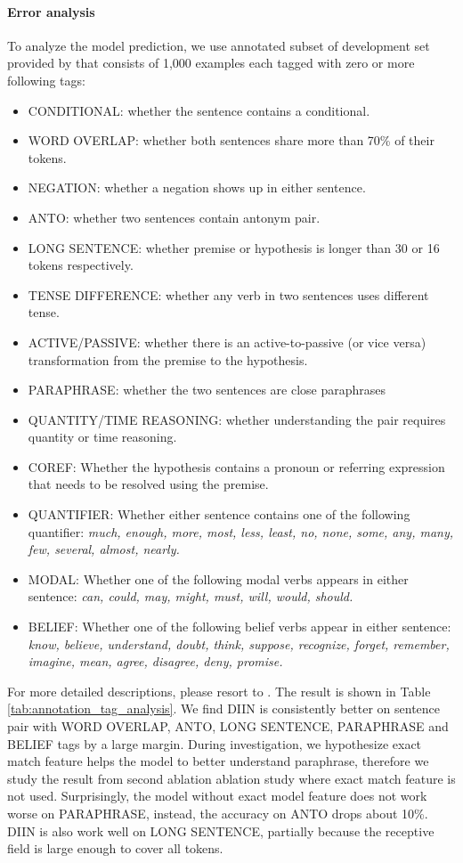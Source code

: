 \documentclass{article} \usepackage{iclr2018_conference,times}
\begin{document}
\paragraph{Error analysis} To analyze the model prediction, we use annotated subset of development set provided by \citet{MultiNLI_Williams:2017tk} that consists of 1,000 examples each tagged with zero or more following tags:
\begin{itemize}
  \item CONDITIONAL: whether the sentence contains a conditional.
  \item WORD OVERLAP: whether both sentences share more than 70\% of their tokens.
  \item NEGATION: whether a negation shows up in either sentence.
  \item ANTO: whether two sentences contain antonym pair.
  \item LONG SENTENCE: whether premise or hypothesis is longer than 30 or 16 tokens respectively.
  \item TENSE DIFFERENCE: whether any verb in two sentences uses different tense.
  \item ACTIVE/PASSIVE: whether there is an active-to-passive (or vice versa) transformation from the premise to the hypothesis.
  \item PARAPHRASE: whether the two sentences are close paraphrases
  \item QUANTITY/TIME REASONING: whether understanding the pair requires quantity or time reasoning.
  \item COREF: Whether the hypothesis contains a pronoun or referring expression that needs to be resolved using the premise.
  \item QUANTIFIER: Whether either sentence contains one of the following quantifier: \textit{much, enough, more, most, less, least, no, none, some, any, many, few, several, almost, nearly.}
  \item MODAL: Whether one of the following modal verbs appears in either sentence: \textit{can, could, may, might, must, will, would, should.}
  \item BELIEF: Whether one of the following belief verbs appear in either sentence: \textit{know, believe, understand, doubt, think, suppose, recognize, forget, remember, imagine, mean, agree, disagree, deny, promise.}
\end{itemize}
For more detailed descriptions, please resort to \citet{MultiNLI_Williams:2017tk}. The result is shown in Table \ref{tab:annotation_tag_analysis}. We find DIIN is consistently better on sentence pair with WORD OVERLAP, ANTO, LONG SENTENCE, PARAPHRASE and BELIEF tags by a large margin. During investigation, we hypothesize exact match feature helps the model to better understand paraphrase, therefore we study the result from second ablation ablation study where exact match feature is not used. Surprisingly, the model without exact model feature does not work worse on PARAPHRASE, instead, the accuracy on ANTO drops about 10\%. DIIN is also work well on LONG SENTENCE, partially because the receptive field is large enough to cover all tokens.
\end{document}
